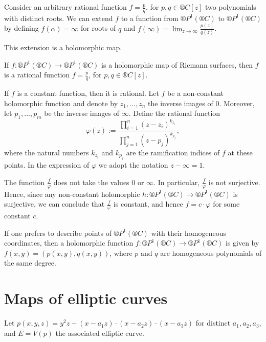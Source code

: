 \documentclass[12pt]{article}					%
\begin{document}
\begin{priklad}[Recall]
	Consider an arbitrary rational function $f = \frac{p}{q}$, for $p, q \in ®C[z]$ two polynomials with distinct roots. We can extend $f$ to a function from $®P^1(®C)$ to $®P^1(®C)$ by defining $f(α) = ∞$ for roots of $q$ and $f(∞) = \lim_{z \rightarrow ∞} \frac{p(z)}{q(z)}$.

	This extension is a holomorphic map.
\end{priklad}

\begin{veta}
	If $f: ®P^1(®C) \rightarrow ®P^1(®C)$ is a holomorphic map of Riemann surfaces, then $f$ is a rational function $f = \frac{p}{q}$, for $p, q \in ®C[z]$.

	\begin{dukazin}
		If $f$ is a constant function, then it is rational. Let $f$ be a non-constant holomorphic function and denote by $z_1, …, z_n$ the inverse images of $0$. Moreover, let $p_1, …, p_m$ be the inverse images of $∞$. Define the rational function
		$$ φ(z) := \frac{\prod_{i=1}^n (z - z_i)^{k_{z_i}}}{\prod_{j=1}^n (z - p_j)^{k_{p_j}}}, $$
		where the natural numbers $k_{z_i}$ and $k_{p_j}$ are the ramification indices of $f$ at these points. In the expression of $φ$ we adopt the notation $z - ∞ = 1$.

		The function $\frac{f}{φ}$ does not take the values $0$ or $∞$. In particular, $\frac{f}{φ}$ is not surjective. Hence, since any non-constant holomorphic $h: ®P^1(®C) \rightarrow ®P^1(®C)$ is surjective, we can conclude that $\frac{f}{φ}$ is constant, and hence $f = c·φ$ for some constant $c$.
	\end{dukazin}
\end{veta}

\begin{poznamka}
	If one prefers to describe points of $®P^1(®C)$ with their homogeneous coordinates, then a holomorphic function $f: ®P^1(®C) \rightarrow ®P^1(®C)$ is given by $f(x, y) = (p(x, y), q(x, y))$, where $p$ and $q$ are homogeneous polynomials of the same degree.
\end{poznamka}

\section{Maps of elliptic curves}
\begin{definice}
	Let $p(x, y, z) = y^2 z - (x - a_1z)·(x - a_2z)·(x - a_3z)$ for distinct $a_1, a_2, a_3$, and $E = V(p)$ the associated elliptic curve.
\end{definice}
\end{document}
